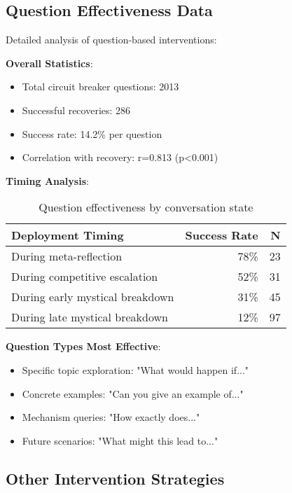 \documentclass[11pt,letterpaper]{article}
\newcommand{\exponedataQuestionCorrelation}{0.813}
\newcommand{\exponedataQuestionPValue}{p\textless0.001}
\newcommand{\exponedataTotalQuestions}{2013}
\newcommand{\exponedataTotalRecoveries}{286}
\newcommand{\exponedataQuestionSuccessRate}{14.2\%} %
\begin{document}
\subsection{Question Effectiveness Data}

Detailed analysis of question-based interventions:

\textbf{Overall Statistics}:
\begin{itemize}
    \item Total circuit breaker questions: \exponedataTotalQuestions{}
    \item Successful recoveries: \exponedataTotalRecoveries{}
    \item Success rate: \exponedataQuestionSuccessRate{} per question
    \item Correlation with recovery: r=\exponedataQuestionCorrelation{} (\exponedataQuestionPValue{})
\end{itemize}

\textbf{Timing Analysis}:
\begin{table}[h]
\centering
\begin{tabular}{lrr}
\toprule
\textbf{Deployment Timing} & \textbf{Success Rate} & \textbf{N} \\
\midrule
During meta-reflection & 78\% & 23 \\
During competitive escalation & 52\% & 31 \\
During early mystical breakdown & 31\% & 45 \\
During late mystical breakdown & 12\% & 97 \\
\bottomrule
\end{tabular}
\caption{Question effectiveness by conversation state}
\label{tab:question_timing}
\end{table}

\textbf{Question Types Most Effective}:
\begin{itemize}
    \item Specific topic exploration: "What would happen if..."
    \item Concrete examples: "Can you give an example of..."
    \item Mechanism queries: "How exactly does..."
    \item Future scenarios: "What might this lead to..."
\end{itemize}

\subsection{Other Intervention Strategies}
\end{document}
